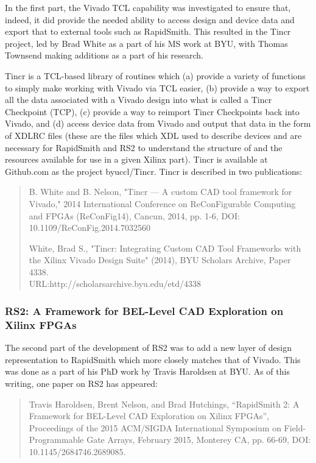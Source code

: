 \documentclass[12pt]{article}
\begin{document}
In the first part, the Vivado TCL capability was investigated to ensure that,
indeed, it did provide the needed ability to access design and device data and
export that to external tools such as RapidSmith.  This resulted in the Tincr
project, led by Brad White as a part of his MS work at BYU, with Thomas Townsend
making additions as a part of his research.

Tincr is a TCL-based library of routines which (a) provide a variety of
functions to simply make working with Vivado via TCL easier, (b) provide a way
to export all the data associated with a Vivado design into what is called a
Tincr Checkpoint (TCP), (c) provide a way to reimport Tincr Checkpoints back
into Vivado, and (d) access device data from Vivado and output that data in the
form of XDLRC files (these are the files which XDL used to describe devices and
are necessary for RapidSmith and RS2 to understand the structure of and the
resources available for use in a given Xilinx part).  Tincr is available at Github.com as
the project byuccl/Tincr.  Tincr is described in two publications:

\begin{quotation}B. White and B. Nelson, "Tincr — A custom CAD tool framework
for Vivado," 2014 International Conference on ReConFigurable Computing and FPGAs (ReConFig14),
Cancun, 2014, pp. 1-6, DOI: 10.1109/ReConFig.2014.7032560

White, Brad S., "Tincr: Integrating Custom CAD Tool Frameworks with
the Xilinx Vivado Design Suite" (2014), BYU Scholars Archive, Paper 4338. 
\\URL:http://scholarsarchive.byu.edu/etd/4338
\end{quotation}

\subsubsection{RS2: A Framework for BEL-Level CAD Exploration on Xilinx FPGAs}
The second part of the development of RS2 was to add a new layer of design
representation to RapidSmith which more closely matches that of Vivado.  This
was done as a part of his PhD work by Travis Haroldsen at BYU.  As of this
writing, one paper on RS2 has appeared:

\begin{quotation}Travis Haroldsen, Brent Nelson, and Brad Hutchings, “RapidSmith
2:
A Framework for BEL-Level CAD Exploration on Xilinx FPGAs”, Proceedings of the
2015 ACM/SIGDA International Symposium on Field-Programmable Gate Arrays,
February 2015, Monterey CA, pp. 66-69, DOI: 10.1145/2684746.2689085.
\end{quotation}
\end{document}
